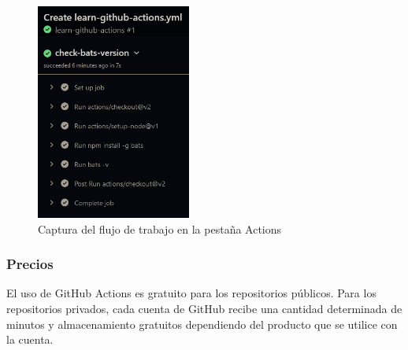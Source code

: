 \documentclass[twoside,twocolumn]{article}
\begin{document}
\begin{figure}[!h]
    \begin{center}
        \includegraphics[width = 2in]{./Imagenes/Screenshot_2.png}
        \caption{Captura del flujo de trabajo en la pestaña Actions}
    \end{center}
\end{figure}

\subsubsection{Precios}

El uso de GitHub Actions es gratuito para los repositorios públicos. Para los repositorios privados, cada cuenta de GitHub recibe una cantidad determinada de minutos y almacenamiento gratuitos dependiendo del producto que se utilice con la cuenta.
\end{document}
